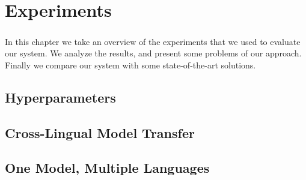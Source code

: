 \chapter{Experiments}
\label{chpt:6}
\paragraph{}
In this chapter we take an overview of the experiments that we used to evaluate our system. We analyze the results, and present some problems of our approach. Finally we compare our system with some state-of-the-art solutions.


\section{Hyperparameters}


\section{Cross-Lingual Model Transfer}


\section{One Model, Multiple Languages}



